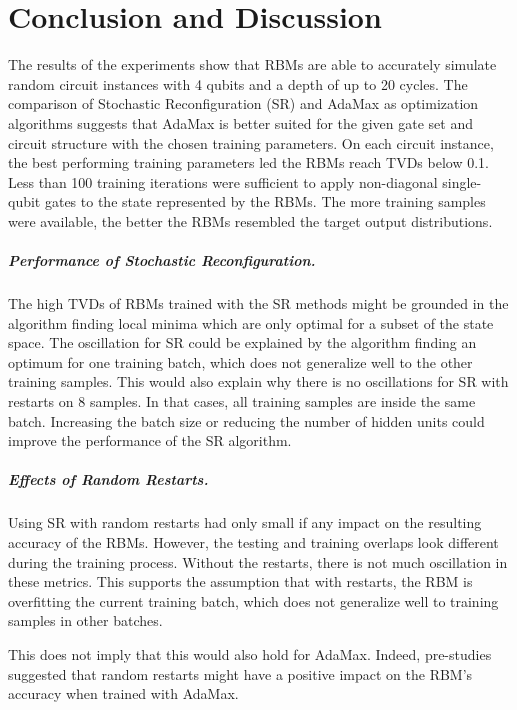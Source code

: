 \chapter{Conclusion and Discussion}
\label{sec:discussion}

The results of the experiments show that RBMs are able to accurately simulate random circuit 
instances with 4 qubits and a depth of up to 20 cycles. The comparison of 
Stochastic Reconfiguration (SR) and AdaMax as optimization algorithms suggests that 
AdaMax is better suited for the given gate set and circuit structure with the chosen training 
parameters. On each circuit instance, the best performing training parameters led 
the RBMs reach TVDs below 0.1. Less than 100 training iterations were sufficient to 
apply non-diagonal single-qubit gates to the state represented by the RBMs. 
The more training samples were available, the better the RBMs resembled the target output distributions.

\paragraph{Performance of Stochastic Reconfiguration.}
The high TVDs of RBMs trained with the SR methods might be grounded in the algorithm finding 
local minima which are only optimal for a subset of the state space. The oscillation for SR could be explained by the algorithm finding an 
optimum for one training batch, which does not generalize well to the other training samples.
This would also explain why there is no oscillations for SR with restarts on 8 samples. In that
cases, all training samples are inside the same batch. Increasing the batch size or reducing the 
number of hidden units could improve the performance of the SR algorithm.

\paragraph{Effects of Random Restarts.}
Using SR with random restarts had only small if any 
impact on the resulting accuracy of the RBMs. However, the testing and training overlaps 
look different during the training process. Without the restarts, there is not much 
oscillation in these metrics. This supports the assumption that with restarts, the 
RBM is overfitting the current training batch, which does not generalize well to training 
samples in other batches. 

This does not imply that this would also 
hold for AdaMax. Indeed, pre-studies suggested that random restarts might have a positive 
impact on the RBM's accuracy when trained with AdaMax.

